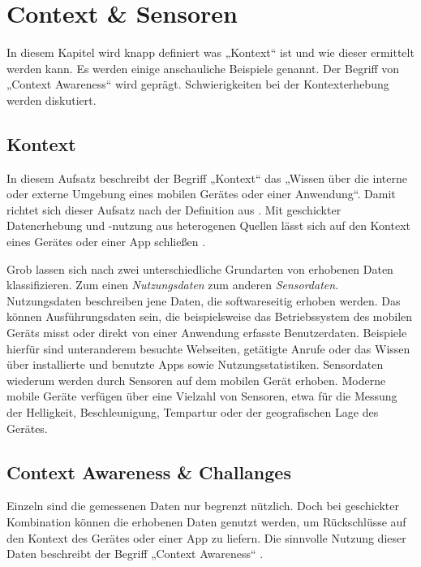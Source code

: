 \chapter{Context \& Sensoren}
\label{chap:context}

In diesem Kapitel wird knapp definiert was „Kontext“ ist und wie dieser ermittelt werden kann. Es werden einige anschauliche Beispiele genannt. Der Begriff von „Context Awareness“ wird geprägt. Schwierigkeiten bei der Kontexterhebung werden diskutiert.

\section{Kontext}

In diesem Aufsatz beschreibt der Begriff „Kontext“ das „Wissen über die interne oder externe Umgebung eines mobilen Gerätes oder einer Anwendung“. Damit richtet sich dieser Aufsatz nach der Definition aus \cite{context2015}. Mit geschickter Datenerhebung und -nutzung aus heterogenen Quellen lässt sich auf den Kontext eines Gerätes oder einer App schließen \cite{orsini2016}.

Grob lassen sich nach \cite{context2015} zwei unterschiedliche Grundarten von erhobenen Daten klassifizieren. Zum einen \textit{Nutzungsdaten} zum anderen \textit{Sensordaten}. Nutzungsdaten beschreiben jene Daten, die softwareseitig erhoben werden. Das können Ausführungsdaten sein, die beispielsweise das Betriebssystem des mobilen Geräts misst oder direkt von einer Anwendung erfasste Benutzerdaten. Beispiele hierfür sind unteranderem besuchte Webseiten, getätigte Anrufe oder das Wissen über installierte und benutzte Apps sowie Nutzungsstatistiken. Sensordaten wiederum werden durch Sensoren auf dem mobilen Gerät erhoben. Moderne mobile Geräte verfügen über eine Vielzahl von Sensoren, etwa für die Messung der Helligkeit, Beschleunigung, Tempartur oder der geografischen Lage des Gerätes.

\section{Context Awareness \& Challanges}

Einzeln sind die gemessenen Daten nur begrenzt nützlich. Doch bei geschickter Kombination können die erhobenen Daten genutzt werden, um Rückschlüsse auf den Kontext des Gerätes oder einer App zu liefern. Die sinnvolle Nutzung dieser Daten beschreibt der Begriff „Context Awareness“ \cite{context2015, orsini2016}.

